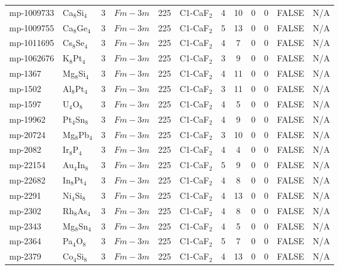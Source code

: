 {\begin{longtable}{llcccccccccc}
    mp-1009733 & Ca$_{8}$Si$_{4}$ & 3     & $Fm-3m$ & 225   & C1-CaF$_{2}$ & 4     & 10    & 0     & 0     & FALSE & N/A \\
    mp-1009755 & Ca$_{8}$Ge$_{4}$ & 3     & $Fm-3m$ & 225   & C1-CaF$_{2}$ & 5     & 13    & 0     & 0     & FALSE & N/A \\
    mp-1011695 & Cs$_{8}$Se$_{4}$ & 3     & $Fm-3m$ & 225   & C1-CaF$_{2}$ & 4     & 7     & 0     & 0     & FALSE & N/A \\
    mp-1062676 & K$_{8}$Pt$_{4}$ & 3     & $Fm-3m$ & 225   & C1-CaF$_{2}$ & 3     & 9     & 0     & 0     & FALSE & N/A \\
    mp-1367 & Mg$_{8}$Si$_{4}$ & 3     & $Fm-3m$ & 225   & C1-CaF$_{2}$ & 4     & 11    & 0     & 0     & FALSE & N/A \\
    mp-1502 & Al$_{8}$Pt$_{4}$ & 3     & $Fm-3m$ & 225   & C1-CaF$_{2}$ & 3     & 11    & 0     & 0     & FALSE & N/A \\
    mp-1597 & U$_{4}$O$_{8}$ & 3     & $Fm-3m$ & 225   & C1-CaF$_{2}$ & 4     & 5     & 0     & 0     & FALSE & N/A \\
    mp-19962 & Pt$_{4}$Sn$_{8}$ & 3     & $Fm-3m$ & 225   & C1-CaF$_{2}$ & 4     & 9     & 0     & 0     & FALSE & N/A \\
    mp-20724 & Mg$_{8}$Pb$_{4}$ & 3     & $Fm-3m$ & 225   & C1-CaF$_{2}$ & 3     & 10    & 0     & 0     & FALSE & N/A \\
    mp-2082 & Ir$_{8}$P$_{4}$ & 3     & $Fm-3m$ & 225   & C1-CaF$_{2}$ & 4     & 4     & 0     & 0     & FALSE & N/A \\
    mp-22154 & Au$_{4}$In$_{8}$ & 3     & $Fm-3m$ & 225   & C1-CaF$_{2}$ & 5     & 9     & 0     & 0     & FALSE & N/A \\
    mp-22682 & In$_{8}$Pt$_{4}$ & 3     & $Fm-3m$ & 225   & C1-CaF$_{2}$ & 4     & 8     & 0     & 0     & FALSE & N/A \\
    mp-2291 & Ni$_{4}$Si$_{8}$ & 3     & $Fm-3m$ & 225   & C1-CaF$_{2}$ & 4     & 13    & 0     & 0     & FALSE & N/A \\
    mp-2302 & Rh$_{8}$As$_{4}$ & 3     & $Fm-3m$ & 225   & C1-CaF$_{2}$ & 4     & 8     & 0     & 0     & FALSE & N/A \\
    mp-2343 & Mg$_{8}$Sn$_{4}$ & 3     & $Fm-3m$ & 225   & C1-CaF$_{2}$ & 4     & 5     & 0     & 0     & FALSE & N/A \\
    mp-2364 & Pa$_{4}$O$_{8}$ & 3     & $Fm-3m$ & 225   & C1-CaF$_{2}$ & 5     & 7     & 0     & 0     & FALSE & N/A \\
    mp-2379 & Co$_{4}$Si$_{8}$ & 3     & $Fm-3m$ & 225   & C1-CaF$_{2}$ & 4     & 13    & 0     & 0     & FALSE & N/A \\

\end{longtable}}
